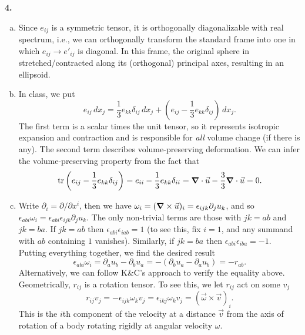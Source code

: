 \documentclass[11pt]{article}
\newcommand{\f}[2]{\frac{#1}{#2}}
\newcommand{\p}{\partial}%
\begin{document}
\noindent \textbf{4.} 
\begin{enumerate}[(a)]
	\item Since $e_{ij}$ is a symmetric tensor, it is orthogonally diagonalizable with real spectrum, i.e., we can orthogonally transform the standard frame into one in which $e_{ij} \to e'_{ij}$ is diagonal. In this frame, the original sphere in stretched/contracted along its (orthogonal) principal axes, resulting in an ellipsoid. 
	
	\item In class, we put
	\begin{equation*}
	e_{ij}\,dx_j = \f{1}{3}e_{kk}\delta_{ij}\,dx_j + \left( e_{ij} - \f{1}{3}e_{kk}\delta_{ij}\right)\,dx_j.
	\end{equation*}
	The first term is a scalar times the unit tensor, so it represents isotropic expansion and contraction and is responsible for \textit{all} volume change (if there is any).  The second term describes volume-preserving deformation. We can infer the volume-preserving property from the fact that 
	\begin{equation*}
	 \tr\left( e_{ij} - \f{1}{3}e_{kk}\delta_{ij}\right) =  e_{ii} - \f{1}{3}e_{kk}\delta_{ii} = \grad \cdot \vec{u} - \f{3}{3} \grad\cdot \vec{u} = 0.
	\end{equation*}
	
	\item Write $\p_i = \p/\p x^i$, then we have $\omega_i = (\grad \times \vec{u})_i = \epsilon_{ijk}\p_j u_k$, and so $\epsilon_{abi}\omega_i = \epsilon_{abi}\epsilon_{ijk}\p_j u_k$. The only non-trivial terms are those with $jk = ab$ and $jk = ba$. If $jk = ab$ then $\epsilon_{abi}\epsilon_{iab} = 1$ (to see this, fix $i=1$, and any summand with $ab$ containing $1$ vanishes). Similarly, if $jk = ba$ then $\epsilon_{abi}\epsilon_{iba} = -1$. Putting everything together, we find the desired result
	\begin{equation*}
	\epsilon_{abi}\omega_i = \p_a u_b - \p_b u_a = -\left( \p_b u_a - \p_a u_b \right)  = -r_{ab}.
	\end{equation*}
	Alternatively, we can follow K\&C's approach to verify the equality above.\\
	
	
	\noindent Geometrically, $r_{ij}$ is a rotation tensor. To see this, we let $r_{ij}$ act on some $v_j$
	\begin{equation*}
	r_{ij}v_j = -\epsilon_{ijk}\omega_kv_j = \epsilon_{ikj}\omega_k v_j = (\vec{\omega}\times \vec{v})_i.
	\end{equation*} 
	This is the $i$th component of the velocity at a distance $\vec{v}$ from the axis of rotation of a body rotating rigidly at angular velocity $\omega$.  
\end{enumerate}
$\,$
\end{document}
